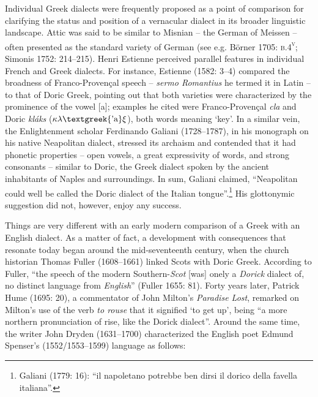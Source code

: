 \documentclass[12pt]{article}
\newenvironment{styleStandard}{\renewcommand\baselinestretch{1.25}\setlength\leftskip{0in}\setlength\rightskip{0in}\setlength\parindent{0.1972in}\setlength\parfillskip{0pt plus 1fil}\setlength\parskip{0in plus 1pt}\writerlistparindent\writerlistleftskip\leavevmode\normalfont\normalsize\writerlistlabel\ignorespaces}{\unskip\vspace{0in plus 1pt}\par}
\newcommand\writerlistleftskip{}
\newcommand\writerlistparindent{}
\newcommand\writerlistlabel{}
\begin{document}
\begin{styleStandard}
Individual Greek dialects were frequently proposed as a point of comparison for clarifying the status and position of a vernacular dialect in its broader linguistic landscape. Attic was said to be similar to Misnian – the German of Meissen – often presented as the standard variety of German (see e.g. Börner 1705: \textsc{b.4}\textsc{\textsuperscript{v}}; Simonis 1752: 214–215). Henri Estienne perceived parallel features in individual French and Greek dialects. For instance, Estienne (1582: 3–4) compared the broadness of Franco-Provençal speech – \textit{sermo Romantius} he termed it in Latin – to that of Doric Greek, pointing out that both varieties were characterized by the prominence of the vowel [a]; examples he cited were Franco-Provençal \textit{cla} and Doric \textit{kláks }($\kappa \lambda \text{\textgreek{'a}}\xi $), both words meaning ‘key’. In a similar vein, the Enlightenment scholar Ferdinando Galiani (1728–1787), in his monograph on his native Neapolitan dialect, stressed its archaism and contended that it had phonetic properties – open vowels, a great expressivity of words, and strong consonants – similar to Doric, the Greek dialect spoken by the ancient inhabitants of Naples and surroundings. In sum, Galiani claimed, “Neapolitan could well be called the Doric dialect of the Italian tongue”.\footnote{ Galiani (1779: 16): “il napoletano potrebbe ben dirsi il dorico della favella italiana”.} His glottonymic suggestion did not, however, enjoy any success.
\end{styleStandard}

\begin{styleStandard}
Things are very different with an early modern comparison of a Greek with an English dialect. As a matter of fact, a development with consequences that resonate today began around the mid-seventeenth century, when the church historian Thomas Fuller (1608–1661) linked Scots with Doric Greek. According to Fuller, “the speech of the modern Southern-\textit{Scot} [was] onely a \textit{Dorick} dialect of, no distinct language from \textit{English}” (Fuller 1655: 81). Forty years later, Patrick Hume (1695: 20), a commentator of John Milton’s \textit{Paradise Lost}, remarked on Milton’s use of the verb \textit{to rouse} that it signified ‘to get up’, being “a more northern pronunciation of rise, like the Dorick dialect”. Around the same time, the writer John Dryden (1631–1700) characterized the English poet Edmund Spenser’s (1552/1553–1599) language as follows:
\end{styleStandard}
\end{document}
